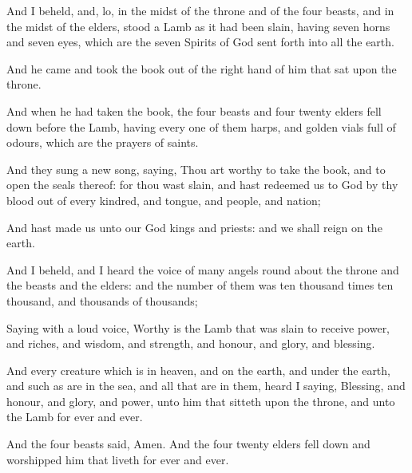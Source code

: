 {And I
beheld,
and,
lo,
in the
midst of the
throne
and of the
four
beasts,
and
in the
midst of the
elders,
stood a
Lamb
as it had been
slain,
having
seven
horns
and
seven
eyes,
which
are the
seven
Spirits of
God sent
forth
into
all the
earth.

And he
came
and
took the
book out
of the right
hand of
him that
sat
upon the
throne.

And
when he had
taken the
book, the
four
beasts
and
four
{}
twenty
elders fell
down
before the
Lamb,
having
every one of them
harps,
and
golden
vials
full of
odours,
which
are the
prayers of
saints.

And they
sung a
new
song,
saying, Thou
art
worthy to
take the
book,
and to
open the
seals
thereof:
for thou wast
slain,
and hast
redeemed
us to
God
by
thy
blood
out of
every
kindred,
and
tongue,
and
people,
and
nation;

And hast
made
us unto
our
God
kings
and
priests:
and we shall
reign
on the
earth.

And I
beheld,
and I
heard the
voice of
many
angels round
about the
throne
and the
beasts
and the
elders:
and the
number of
them was ten thousand
times ten
thousand,
and
thousands of
thousands;

Saying with a
loud
voice,
Worthy
is the
Lamb that was
slain to
receive
power,
and
riches,
and
wisdom,
and
strength,
and
honour,
and
glory,
and
blessing.

And
every
creature
which
is
in
heaven,
and
on the
earth,
and
under the
earth,
and such
as
are
in the
sea,
and
all that are
in
them, heard
I
saying,
Blessing,
and
honour,
and
glory,
and
power,
{} unto
him that
sitteth
upon the
throne,
and unto the
Lamb
for
ever and
ever.

And the
four
beasts
said,
Amen.
And the
four
{}
twenty
elders fell
down
and
worshipped him that
liveth
for
ever and
ever.




\par }
